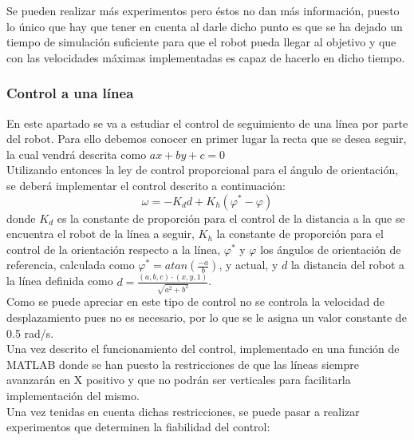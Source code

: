 \documentclass[a4paper,twoside]{article}
\begin{document}
	Se pueden realizar más experimentos pero éstos no dan más información, puesto lo único que hay que tener en cuenta al darle dicho punto es que se ha dejado un tiempo de simulación suficiente para que el robot pueda llegar al objetivo y que con las velocidades máximas implementadas es capaz de hacerlo en dicho tiempo.

	
	
	\subsubsection{Control a una línea}
	En este apartado se va a estudiar el control de seguimiento de una línea por parte del robot. Para ello debemos conocer en primer lugar la recta que se desea seguir, la cual vendrá descrita como $ax+by+c=0$\\
	Utilizando entonces la ley de control proporcional para el ángulo de orientación, se deberá implementar el control descrito a continuación:
	\begin{equation}
	\omega=-K_dd+K_h(\varphi^*-\varphi)
	\end{equation}
	donde $K_d$ es la constante de proporción para el control de la distancia a la que se encuentra el robot de la línea a seguir, $K_h$ la constante de proporción para el control de la orientación respecto a la línea, $\varphi^*$ y $\varphi$ los ángulos de orientación de referencia, calculada como $\varphi^*=atan(\frac{-a}{b})$, y actual, y $d$ la distancia del robot a la línea definida como $d=\frac{(a,b,c)\cdot(x,y,1)}{\sqrt{a^2+b^2}}$.\\
	Como se puede apreciar en este tipo de control no se controla la velocidad de desplazamiento pues no es necesario, por lo que se le asigna un valor constante de 0.5 rad/s.\\
	
	Una vez descrito el funcionamiento del control, implementado en una función de MATLAB donde se han puesto la restricciones de que las líneas siempre avanzarán en X positivo y que no podrán ser verticales para facilitarla implementación del mismo.\\
	Una vez tenidas en cuenta dichas restricciones, se puede pasar a realizar experimentos que determinen la fiabilidad del control:
	
\end{document}

